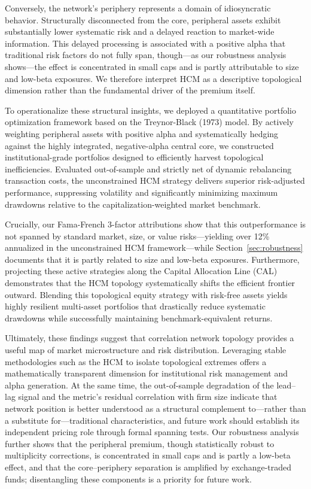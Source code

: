 \documentclass[fleqn]{rbfin}
\begin{document}
Conversely, the network's periphery represents a domain of idiosyncratic behavior. Structurally disconnected from the core, peripheral assets exhibit substantially lower systematic risk and a delayed reaction to market-wide information. This delayed processing is associated with a positive alpha that traditional risk factors do not fully span, though---as our robustness analysis shows---the effect is concentrated in small caps and is partly attributable to size and low-beta exposures. We therefore interpret HCM as a descriptive topological dimension rather than the fundamental driver of the premium itself.

To operationalize these structural insights, we deployed a quantitative portfolio optimization framework based on the Treynor-Black (1973) model. By actively weighting peripheral assets with positive alpha and systematically hedging against the highly integrated, negative-alpha central core, we constructed institutional-grade portfolios designed to efficiently harvest topological inefficiencies. Evaluated out-of-sample and strictly net of dynamic rebalancing transaction costs, the unconstrained HCM strategy delivers superior risk-adjusted performance, suppressing volatility and significantly minimizing maximum drawdowns relative to the capitalization-weighted market benchmark. 

Crucially, our Fama-French 3-factor attributions show that this outperformance is not spanned by standard market, size, or value risks---yielding over 12\% annualized in the unconstrained HCM framework---while Section~\ref{sec:robustness} documents that it is partly related to size and low-beta exposures. Furthermore, projecting these active strategies along the Capital Allocation Line (CAL) demonstrates that the HCM topology systematically shifts the efficient frontier outward. Blending this topological equity strategy with risk-free assets yields highly resilient multi-asset portfolios that drastically reduce systematic drawdowns while successfully maintaining benchmark-equivalent returns.

Ultimately, these findings suggest that correlation network topology provides a useful map of market microstructure and risk distribution. Leveraging stable methodologies such as the HCM to isolate topological extremes offers a mathematically transparent dimension for institutional risk management and alpha generation. At the same time, the out-of-sample degradation of the lead--lag signal and the metric's residual correlation with firm size indicate that network position is better understood as a structural complement to---rather than a substitute for---traditional characteristics, and future work should establish its independent pricing role through formal spanning tests. Our robustness analysis further shows that the peripheral premium, though statistically robust to multiplicity corrections, is concentrated in small caps and is partly a low-beta effect, and that the core--periphery separation is amplified by exchange-traded funds; disentangling these components is a priority for future work.
\end{document}
